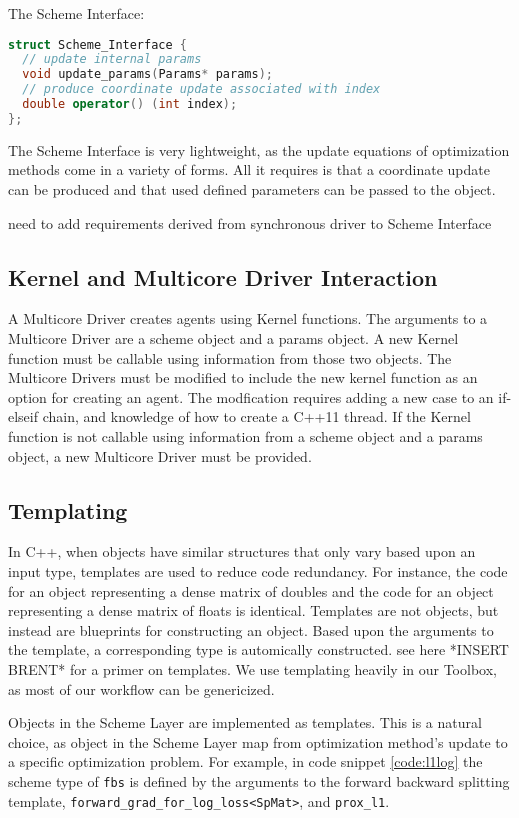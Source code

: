 The Scheme Interface:
\begin{lstlisting}[language=C++]
struct Scheme_Interface {
  // update internal params
  void update_params(Params* params);
  // produce coordinate update associated with index
  double operator() (int index);
};
\end{lstlisting}
The Scheme Interface is very lightweight, as the update equations of optimization methods come in a variety of forms. All it requires is that a coordinate update can be produced and that used defined parameters can be passed to the object.
{{\color{red} need to add requirements derived from synchronous driver to Scheme Interface}

\subsection{Kernel and Multicore Driver Interaction}

A Multicore Driver creates agents using Kernel functions. The arguments to a Multicore Driver are a scheme object and a params object. A new Kernel function must be callable using information from those two objects. The Multicore Drivers must be modified to include the new kernel function as an option for creating an agent. The modfication requires adding a new case to an if-elseif chain, and knowledge of how to create a C++11 thread. If the Kernel function is not callable using information from a scheme object and a params object, a new Multicore Driver must be provided.

\subsection{Templating}

In C++, when objects have similar structures that only vary based upon an input type, templates are used to reduce code redundancy. For instance, the code for an object representing a dense matrix of doubles and the code for an object representing a dense matrix of floats is identical.
Templates are not objects, but instead are blueprints for constructing an object.
Based upon the arguments to the template, a corresponding type is automically constructed. see here *INSERT BRENT* for a primer on templates.
We use templating heavily in our Toolbox, as most of our workflow can be genericized.

Objects in the Scheme Layer are implemented as templates.
This is a natural choice, as object in the Scheme Layer map from optimization method's update to a specific optimization problem.
For example, in code snippet \ref{code:l1log} the scheme type of \texttt{fbs} is defined by the arguments to the forward backward splitting template, \texttt{forward\_grad\_for\_log\_loss<SpMat>}, and \texttt{prox\_l1}.

}
